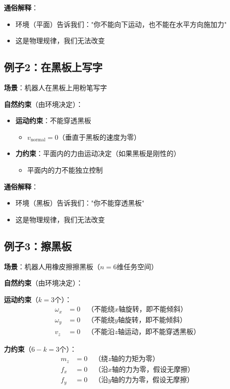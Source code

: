 \documentclass[12pt,a4paper]{article}
\begin{document}
\textbf{通俗解释}：
\begin{itemize}
\item 环境（平面）告诉我们："你不能向下运动，也不能在水平方向施加力"
\item 这是物理规律，我们无法改变
\end{itemize}

\subsection{例子2：在黑板上写字}

\textbf{场景}：机器人在黑板上用粉笔写字

\textbf{自然约束}（由环境决定）：
\begin{itemize}
\item \textbf{运动约束}：不能穿透黑板
\begin{itemize}
\item $v_{\text{normal}} = 0$（垂直于黑板的速度为零）
\end{itemize}
\item \textbf{力约束}：平面内的力由运动决定（如果黑板是刚性的）
\begin{itemize}
\item 平面内的力不能独立控制
\end{itemize}
\end{itemize}

\textbf{通俗解释}：
\begin{itemize}
\item 环境（黑板）告诉我们："你不能穿透黑板"
\item 这是物理规律，我们无法改变
\end{itemize}

\subsection{例子3：擦黑板}

\textbf{场景}：机器人用橡皮擦擦黑板（$n = 6$维任务空间）

\textbf{自然约束}（由环境决定）：

\textbf{运动约束}（$k = 3$个）：
\begin{align}
\omega_x &= 0 \quad \text{（不能绕$x$轴旋转，即不能倾斜）} \\
\omega_y &= 0 \quad \text{（不能绕$y$轴旋转，即不能倾斜）} \\
v_z &= 0 \quad \text{（不能沿$z$轴运动，即不能穿透黑板）}
\end{align}

\textbf{力约束}（$6-k = 3$个）：
\begin{align}
m_z &= 0 \quad \text{（绕$z$轴的力矩为零）} \\
f_x &= 0 \quad \text{（沿$x$轴的力为零，假设无摩擦）} \\
f_y &= 0 \quad \text{（沿$y$轴的力为零，假设无摩擦）}
\end{align}
\end{document}
